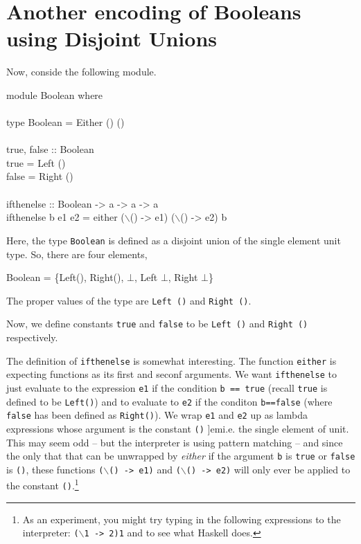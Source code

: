 \documentclass[11pt]{article}
\begin{document}
\newpage
\section{Another encoding of Booleans using Disjoint Unions}

Now, conside the following module.

\begin{program*}
\> module Boolean where  \\
\>  \\
\>   type Boolean = Either () () \\
\>  \\
\>   true, false :: Boolean \\
\>   true = Left () \\
\>   false = Right () \\
\>   \\
\>   ifthenelse :: Boolean -> a -> a  -> a \\
\>   ifthenelse b e1 e2 = either ($\backslash$() -> e1) ($\backslash$() -> e2) b 
\end{program*}
Here, the type {\tt{Boolean}} is defined as a disjoint union of the single
element unit type.  So, there are four elements, 

\begin{program*}
\> Boolean = \{Left(), Right(), $\bot$, Left $\bot$, Right $\bot$\} 
\end{program*}
The proper values of the type are {\tt{Left ()}} and {\tt{Right ()}}.

Now, we define constants {\tt{true}} and {\tt{false}} to be {\tt{Left ()}} and
{\tt{Right ()}} respectively.

The definition of {\tt{ifthenelse}} is somewhat interesting.  The function
{\tt{either}} is expecting functions as its first and seconf arguments. We want
{\tt{ifthenelse}} to just evaluate to the expression {\tt{e1}} if the condition
{\tt{b == true}} (recall {\tt{true}} is defined to be {\tt{Left()}}) and to
evaluate to {\tt{e2}} if the conditon {\tt{b==false}} (where {\tt{false}} has
been defined as {\tt{Right()}}).  We wrap {\tt{e1}} and {\tt{e2}} up as lambda
expressions whose argument is the constant {\tt{()}} {]em{i.e.}} the single
element of unit.  This may seem odd -- but the interpreter is using pattern
matching -- and since the only that that can be unwrapped by {\em{either}} if
the argument {\tt{b}} is {\tt{true}} or {\tt{false}} is {\tt{()}}, these
functions {\tt{($\backslash$() -> e1)}} and {\tt{($\backslash$() -> e2)}} will
only ever be applied to the constant {\tt{()}}.\footnote{As an experiment, you
might try typing in the following expressions to the interpreter:
{\tt{($\backslash$1 -> 2)1}} and  to see what
Haskell does.}
\end{document}
